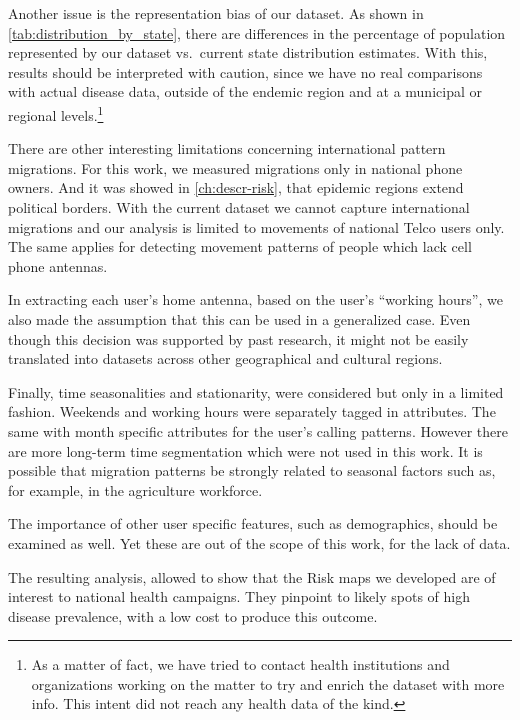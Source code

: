 Another issue is the representation bias of our dataset.
As shown in \cref{tab:distribution_by_state}, there are differences in the percentage of population represented by our dataset vs.\ current state distribution estimates.
With this, results should be interpreted with caution, since we have no real comparisons with actual disease data, outside of the endemic region and at a municipal or regional levels.\footnote{As a matter of fact, we have tried to contact health institutions and organizations working on the matter to try and enrich the dataset with more info. This intent did not reach any health data of the kind.}

There are other interesting limitations concerning international pattern migrations.
For this work, we measured migrations only in national phone owners.
And it was showed in \cref{ch:descr-risk}, that  epidemic regions extend political borders.
With the current dataset we cannot capture international migrations and our analysis is limited to movements of national Telco users only.
The same applies for detecting movement patterns of people which lack cell phone antennas.

In extracting each user's home antenna, based on the user's ``working hours'', we also made the assumption that this can be used in a generalized case.
Even though this decision was supported by past research, it might not be easily translated into datasets across other geographical and cultural regions.

Finally, time seasonalities and stationarity, were considered but only in a limited fashion.
Weekends and working hours were separately tagged in attributes.
The same with month specific attributes for the user's calling patterns.
However there are more long-term time segmentation which were not used in this work.
It is possible that migration patterns be strongly related to seasonal factors such as, for example, in the agriculture workforce.

The importance of other user specific features, such as demographics, should be examined as well.
Yet these are out of the scope of this work, for the lack of data.








The resulting analysis, allowed to show that the Risk maps we developed are of interest to national health campaigns.
They pinpoint to likely spots of high disease prevalence, with a low cost to produce this outcome.

